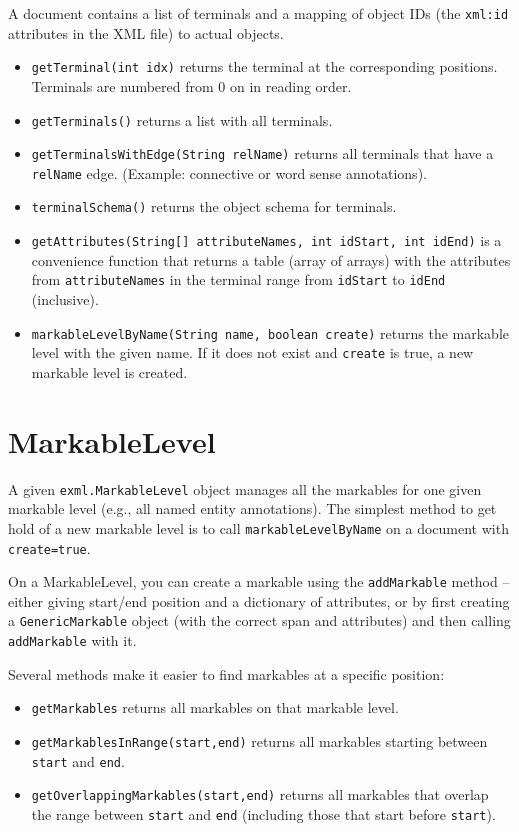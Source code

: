 \documentclass[a4paper,11pt]{report}
\begin{document}
A document contains a list of terminals and a mapping of object IDs (the \texttt{xml:id}
attributes in the XML file) to actual objects.
\begin{itemize}
\item \texttt{getTerminal(int idx)} returns the terminal at the corresponding
positions. Terminals are numbered from 0 on in reading order.
\item \texttt{getTerminals()} returns a list with all terminals.
\item \texttt{getTerminalsWithEdge(String relName)} returns all terminals
that have a \texttt{relName} edge. (Example: connective or word sense annotations).
\item \texttt{terminalSchema()} returns the object schema for terminals.
\item \texttt{getAttributes(String[] attributeNames, int idStart, int idEnd)} is
a convenience function that returns a table (array of arrays) with the attributes from
\texttt{attributeNames} in the terminal range from \texttt{idStart} to \texttt{idEnd} (inclusive).
\item \texttt{markableLevelByName(String name, boolean create)} returns the markable level
with the given name. If it does not exist and \texttt{create} is true, a new markable
level is created.
\end{itemize}

\section{MarkableLevel}
A given \texttt{exml.MarkableLevel} object manages all the markables for one given markable
level (e.g., all named entity annotations). The simplest method to get hold of a new markable
level is to call \texttt{markableLevelByName} on a document with \texttt{create=true}.

On a MarkableLevel, you can create a markable using the \texttt{addMarkable} method --
either giving start/end position and a dictionary of attributes, or by first creating
a \texttt{GenericMarkable} object (with the correct span and attributes) and then
calling \texttt{addMarkable} with it.

Several methods make it easier to find markables at a specific position:
\begin{itemize}
\item \texttt{getMarkables} returns all markables on that markable level.
\item \texttt{getMarkablesInRange(start,end)} returns all markables starting
between \texttt{start} and \texttt{end}.
\item \texttt{getOverlappingMarkables(start,end)} returns all markables
that overlap the range between \texttt{start} and \texttt{end} (including
those that start before \texttt{start}).
\end{itemize}
\end{document}

